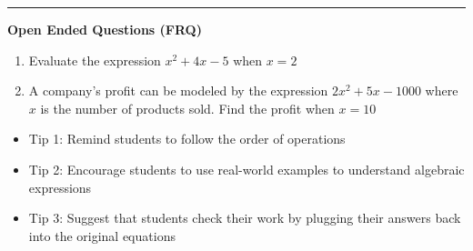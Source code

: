\documentclass[10pt]{article}
\begin{document}
\vspace{-0.2cm}
\hrule
\vspace{0.2cm}
\textbf{\small Open Ended Questions (FRQ)}
\begin{enumerate}[label=\textbf{Q\arabic*.}, start=9, itemsep=5pt, topsep=0pt]

  \item \small Evaluate the expression $x^2 + 4x - 5$ when $x = 2$ \vspace{2cm}

  \item \small A company's profit can be modeled by the expression $2x^2 + 5x - 1000$ where $x$ is the number of products sold. Find the profit when $x = 10$ \vspace{2cm}

\end{enumerate}

\vfill

\begin{tcolorbox}[colback=blue!5, colframe=mainblue!50, title=\small \textbf{Chef's Tips}, fonttitle=\bfseries, bottom=1mm]
\begin{itemize}[noitemsep, topsep=2pt, leftmargin=0.5cm]
  \item \scriptsize Tip 1: Remind students to follow the order of operations\item \scriptsize Tip 2: Encourage students to use real-world examples to understand algebraic expressions\item \scriptsize Tip 3: Suggest that students check their work by plugging their answers back into the original equations
\end{itemize}
\end{tcolorbox}
\end{document}
